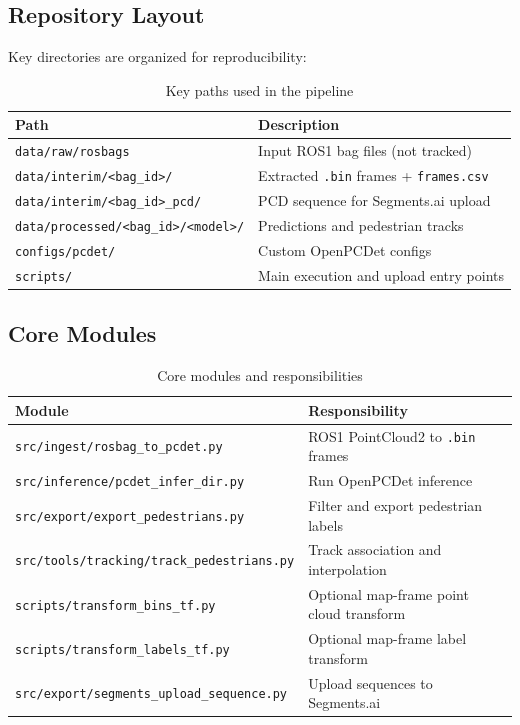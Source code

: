\documentclass[a4paper,12pt]{article}
\begin{document}
\subsection{Repository Layout}
Key directories are organized for reproducibility:
\begin{table}[H]
\centering
\caption{Key paths used in the pipeline}
\label{tab:data_layout}
\small
\begin{tabularx}{\textwidth}{>{\raggedright\arraybackslash}p{} X}
\toprule
Path & Description \\
\midrule
\texttt{data/raw/rosbags} & Input ROS1 bag files (not tracked) \\
\texttt{data/interim/\textless bag\_id\textgreater/} & Extracted \texttt{.bin} frames + \texttt{frames.csv} \\
\texttt{data/interim/\textless bag\_id\textgreater\_pcd/} & PCD sequence for Segments.ai upload \\
\texttt{data/processed/\textless bag\_id\textgreater/\textless model\textgreater/} & Predictions and pedestrian tracks \\
\texttt{configs/pcdet/} & Custom OpenPCDet configs \\
\texttt{scripts/} & Main execution and upload entry points \\
\bottomrule
\end{tabularx}
\normalsize
\end{table}

\subsection{Core Modules}
\begin{table}[H]
\centering
\caption{Core modules and responsibilities}
\label{tab:modules}
\small
\begin{tabularx}{\textwidth}{>{\raggedright\arraybackslash}p{} X}
\toprule
Module & Responsibility \\
\midrule
\texttt{src/ingest/rosbag\_to\_pcdet.py} & ROS1 PointCloud2 to \texttt{.bin} frames \\
\texttt{src/inference/pcdet\_infer\_dir.py} & Run OpenPCDet inference \\
\texttt{src/export/export\_pedestrians.py} & Filter and export pedestrian labels \\
\texttt{src/tools/tracking/track\_pedestrians.py} & Track association and interpolation \\
\texttt{scripts/transform\_bins\_tf.py} & Optional map-frame point cloud transform \\
\texttt{scripts/transform\_labels\_tf.py} & Optional map-frame label transform \\
\texttt{src/export/segments\_upload\_sequence.py} & Upload sequences to Segments.ai \\
\bottomrule
\end{tabularx}
\normalsize
\end{table}
\end{document}

